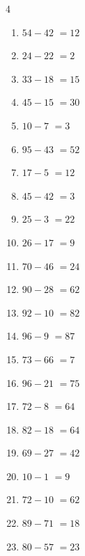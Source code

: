 \begin{multicols}{4}
\begin{enumerate}
  \item $54-42$
        $=12$

  \item $24-22$
        $=2$

  \item $33-18$
        $=15$

  \item $45-15$
        $=30$

  \item $10-7$
        $=3$

  \item $95-43$
        $=52$

\columnbreak %

  \item $17-5$
        $=12$

  \item $45-42$
        $=3$

  \item $25-3$
        $=22$

  \item $26-17$
        $=9$

  \item $70-46$
        $=24$

  \item $90-28$
        $=62$

  \item $92-10$
        $=82$

  \item $96-9$
        $=87$

  \item $73-66$
        $=7$

  \item $96-21$
        $=75$

  \item $72-8$
        $=64$

  \item $82-18$
        $=64$

  \item $69-27$
        $=42$

  \item $10-1$
        $=9$

  \item $72-10$
        $=62$

  \item $89-71$
        $=18$

  \item $80-57$
        $=23$


\end{enumerate}
\end{multicols}
